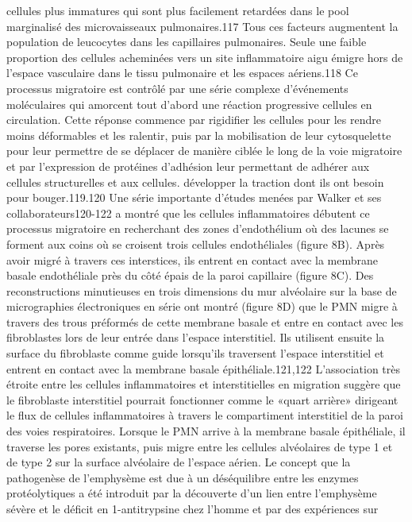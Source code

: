\documentclass[12pt,]{article}
\begin{document}
cellules plus immatures qui sont plus facilement retardées dans le pool
marginalisé des microvaisseaux pulmonaires.117 Tous ces facteurs
augmentent la population de leucocytes dans les capillaires pulmonaires.
Seule une faible proportion des cellules acheminées vers un site
inflammatoire aigu émigre hors de l'espace vasculaire dans le tissu
pulmonaire et les espaces aériens.118 Ce processus migratoire est
contrôlé par une série complexe d'événements moléculaires qui amorcent
tout d'abord une réaction progressive cellules en circulation. Cette
réponse commence par rigidifier les cellules pour les rendre moins
déformables et les ralentir, puis par la mobilisation de leur
cytosquelette pour leur permettre de se déplacer de manière ciblée le
long de la voie migratoire et par l'expression de protéines d'adhésion
leur permettant de adhérer aux cellules structurelles et aux cellules.
développer la traction dont ils ont besoin pour bouger.119.120 Une série
importante d'études menées par Walker et ses collaborateurs120-122 a
montré que les cellules inflammatoires débutent ce processus migratoire
en recherchant des zones d'endothélium où des lacunes se forment aux
coins où se croisent trois cellules endothéliales (figure 8B). Après
avoir migré à travers ces interstices, ils entrent en contact avec la
membrane basale endothéliale près du côté épais de la paroi capillaire
(figure 8C). Des reconstructions minutieuses en trois dimensions du mur
alvéolaire sur la base de micrographies électroniques en série ont
montré (figure 8D) que le PMN migre à travers des trous préformés de
cette membrane basale et entre en contact avec les fibroblastes lors de
leur entrée dans l'espace interstitiel. Ils utilisent ensuite la surface
du fibroblaste comme guide lorsqu'ils traversent l'espace interstitiel
et entrent en contact avec la membrane basale épithéliale.121,122
L'association très étroite entre les cellules inflammatoires et
interstitielles en migration suggère que le fibroblaste interstitiel
pourrait fonctionner comme le «quart arrière» dirigeant le flux de
cellules inflammatoires à travers le compartiment interstitiel de la
paroi des voies respiratoires. Lorsque le PMN arrive à la membrane
basale épithéliale, il traverse les pores existants, puis migre entre
les cellules alvéolaires de type 1 et de type 2 sur la surface
alvéolaire de l'espace aérien. Le concept que la pathogenèse de
l'emphysème est due à un déséquilibre entre les enzymes protéolytiques a
été introduit par la découverte d'un lien entre l'emphysème sévère et le
déficit en 1-antitrypsine chez l'homme et par des expériences sur
\end{document}
